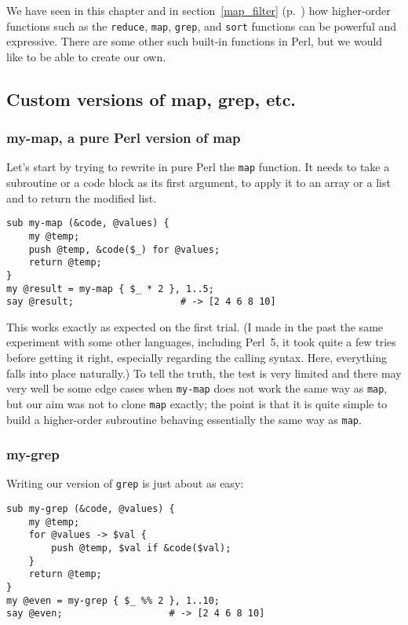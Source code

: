 We have seen in this chapter and in 
section~\ref{map_filter} (p.~\pageref{map_filter}) 
how higher-order functions such as the {\tt reduce}, 
{\tt map}, {\tt grep}, and {\tt sort} functions 
can be powerful and expressive. There are some 
other such built-in functions in Perl, but we would 
like to be able to create our own.

\subsection{Custom versions of map, grep, etc.}

\subsubsection{my-map, a pure Perl version of map}

Let's start by trying to rewrite in pure Perl the 
{\tt map} function. It needs to take a subroutine 
or a code block as its first argument, to apply it 
to an array or a list and to return the modified 
list.

\begin{verbatim}
sub my-map (&code, @values) { 
    my @temp;
    push @temp, &code($_) for @values;
    return @temp;
}
my @result = my-map { $_ * 2 }, 1..5; 
say @result;                   # -> [2 4 6 8 10]
\end{verbatim}

This works exactly as expected on the first trial. 
(I made in the past the same experiment with some 
other languages, including Perl~5, it took quite 
a few tries before getting it right, especially 
regarding the calling syntax. Here, everything 
falls into place naturally.) To tell the truth, 
the test is very limited and there may very well be 
some edge cases when {\tt my-map} does not work 
the same way as {\tt map}, but our aim was not to 
clone {\tt map} exactly; the point is that it is 
quite simple to build a higher-order subroutine 
behaving essentially the same way as {\tt map}. 

\subsubsection{my-grep}

Writing our version of {\tt grep} is just about as 
easy:
\begin{verbatim}
sub my-grep (&code, @values) { 
    my @temp;
    for @values -> $val {
        push @temp, $val if &code($val);
    }
    return @temp;
}
my @even = my-grep { $_ %% 2 }, 1..10; 
say @even;                   # -> [2 4 6 8 10]
\end{verbatim}

